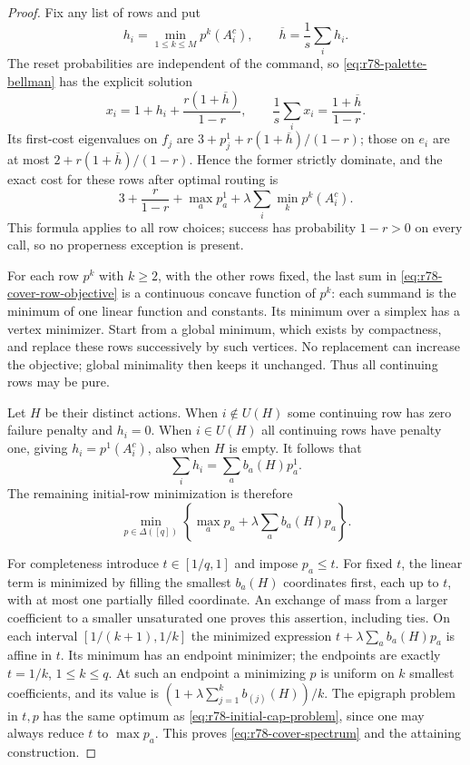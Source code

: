 \begin{proof}
Fix any list of rows and put
\[
 h_i=\min_{1\le k\le M}p^k(A_i^c),\qquad
 \overline h=\frac1s\sum_i h_i.
\]
The reset probabilities are independent of the command, so
\eqref{eq:r78-palette-bellman} has the explicit solution
\[
 x_i=1+h_i+\frac{r(1+\overline h)}{1-r},
 \qquad \frac1s\sum_i x_i=\frac{1+\overline h}{1-r}.
\]
Its first-cost eigenvalues on $f_j$ are
$3+p^1_j+r(1+\overline h)/(1-r)$; those on $e_i$ are at most
$2+r(1+\overline h)/(1-r)$.  Hence the former strictly dominate,
and the exact cost for these rows after optimal routing is
\begin{equation}\label{eq:r78-cover-row-objective}
 3+\frac r{1-r}+\max_a p^1_a+
               \lambda\sum_i\min_k p^k(A_i^c).
\end{equation}
This formula applies to all row choices; success has probability
$1-r>0$ on every call, so no properness exception is present.

For each row $p^k$ with $k\ge2$, with the other rows fixed, the
last sum in \eqref{eq:r78-cover-row-objective} is a continuous
concave function of $p^k$: each summand is the minimum of one
linear function and constants.  Its minimum over a simplex has a
vertex minimizer.  Start from a global minimum, which exists by
compactness, and replace these rows successively by such vertices.
No replacement can increase the objective; global minimality then
keeps it unchanged.  Thus all continuing rows may be pure.

Let $H$ be their distinct actions.  When $i\notin U(H)$ some
continuing row has zero failure penalty and $h_i=0$.  When
$i\in U(H)$ all continuing rows have penalty one, giving
$h_i=p^1(A_i^c)$, also when $H$ is empty.  It follows that
\[
 \sum_i h_i=\sum_a b_a(H)p^1_a.
\]
The remaining initial-row minimization is therefore
\begin{equation}\label{eq:r78-initial-cap-problem}
 \min_{p\in\Delta([q])}\left\{\max_a p_a+
                                  \lambda\sum_a b_a(H)p_a\right\}.
\end{equation}

For completeness introduce $t\in[1/q,1]$ and impose $p_a\le t$.
For fixed $t$, the linear term is minimized by filling the smallest
$b_a(H)$ coordinates first, each up to $t$, with at most one
partially filled coordinate.  An exchange of mass from a larger
coefficient to a smaller unsaturated one proves this assertion,
including ties.  On each interval
$[1/(k+1),1/k]$ the minimized expression
$t+\lambda\sum_a b_a(H)p_a$ is affine in $t$.  Its minimum has an
endpoint minimizer; the endpoints are exactly $t=1/k$,
$1\le k\le q$.  At such an endpoint a minimizing $p$ is uniform
on $k$ smallest coefficients, and its value is
$(1+\lambda\sum_{j=1}^k b_{(j)}(H))/k$.  The epigraph problem in
$t,p$ has the same optimum as \eqref{eq:r78-initial-cap-problem},
since one may always reduce $t$ to $\max p_a$.  This proves
\eqref{eq:r78-cover-spectrum} and the attaining construction.


\end{proof}
